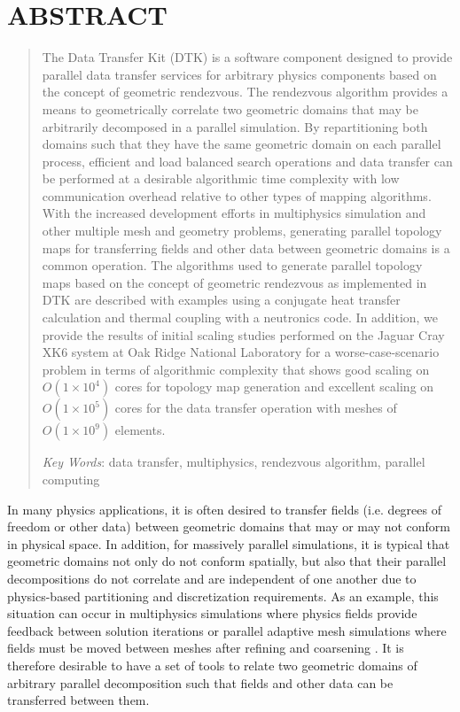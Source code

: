 \documentclass{mc2013}
\begin{document}
\section*{ABSTRACT} 
\begin{quote}
\begin{small}
The Data Transfer Kit (DTK) is a software component designed to
provide parallel data transfer services for arbitrary physics
components based on the concept of geometric rendezvous. The
rendezvous algorithm provides a means to geometrically correlate two
geometric domains that may be arbitrarily decomposed in a parallel
simulation. By repartitioning both domains such that they have the
same geometric domain on each parallel process, efficient and load
balanced search operations and data transfer can be performed at a
desirable algorithmic time complexity with low communication overhead
relative to other types of mapping algorithms. With the increased
development efforts in multiphysics simulation and other multiple mesh
and geometry problems, generating parallel topology maps for
transferring fields and other data between geometric domains is a
common operation. The algorithms used to generate parallel topology
maps based on the concept of geometric rendezvous as implemented in
DTK are described with examples using a conjugate heat transfer
calculation and thermal coupling with a neutronics code. In addition,
we provide the results of initial scaling studies performed on the
Jaguar Cray XK6 system at Oak Ridge National Laboratory for a
worse-case-scenario problem in terms of algorithmic complexity that
shows good scaling on $O(1 \times 10^4)$ cores for topology map
generation and excellent scaling on $O(1 \times 10^5)$ cores for the
data transfer operation with meshes of $O(1 \times 10^9)$ elements.


\emph{Key Words}: data transfer, multiphysics, rendezvous algorithm,
parallel computing
\end{small} 
\end{quote}

\setlength{\baselineskip}{14pt}
\normalsize

\label{sec:intro}

In many physics applications, it is often desired to transfer fields
(i.e. degrees of freedom or other data) between geometric domains that
may or may not conform in physical space. In addition, for massively
parallel simulations, it is typical that geometric domains not only do
not conform spatially, but also that their parallel decompositions do
not correlate and are independent of one another due to physics-based
partitioning and discretization requirements. As an example, this
situation can occur in multiphysics simulations where physics fields
provide feedback between solution iterations \cite{Tautges_2009_2} or
parallel adaptive mesh simulations where fields must be moved between
meshes after refining and coarsening \cite{Edwards_2006}. It is
therefore desirable to have a set of tools to relate two geometric
domains of arbitrary parallel decomposition such that fields and other
data can be transferred between them.
\end{document}
